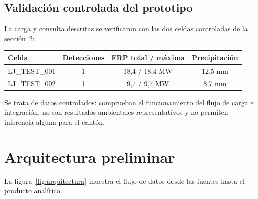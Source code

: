 \documentclass[11pt,a4paper]{article}
\begin{document}
\subsection{Validaci\'on controlada del prototipo}
\footnotesize
La carga y consulta descritas se verificaron con las dos celdas controladas de la secci\'on~2:

\begin{center}
\begin{tabular}{@{}lccc@{}}
\toprule
\textbf{Celda} & \textbf{Detecciones} & \textbf{FRP total / m\'axima} & \textbf{Precipitaci\'on} \\
\midrule
LJ\_TEST\_001 & 1 & 18,4 / 18,4 MW & 12,5 mm \\
LJ\_TEST\_002 & 1 & 9,7 / 9,7 MW & 8,7 mm \\
\bottomrule
\end{tabular}
\end{center}

\vspace{0.1cm}
Se trata de datos controlados: comprueban el funcionamiento del flujo de carga e integraci\'on, no son resultados ambientales representativos y no permiten inferencia alguna para el cant\'on.
\normalsize

\section{Arquitectura preliminar}

La figura~\ref{fig:arquitectura} muestra el flujo de datos desde las fuentes hasta el producto anal\'itico.
\end{document}
